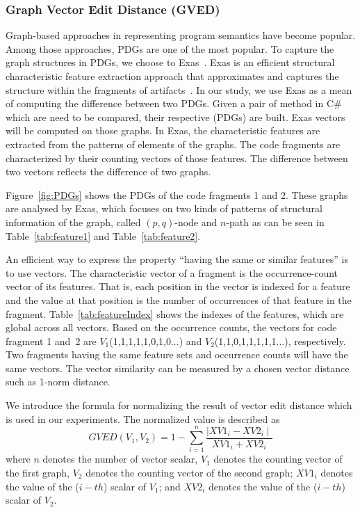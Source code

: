 \subsubsection{\textbf{Graph Vector Edit Distance (GVED)}}

Graph-based approaches in representing program semantics have become
popular. Among those approaches, PDGs are one of the most popular.  To
capture the graph structures in PDGs, we choose to Exas~\cite{fase09}.
Exas is an efficient structural characteristic feature extraction
approach that approximates and captures the structure within the
fragments of artifacts~\cite{fase09}.  In our study, we use Exas as a
mean of computing the difference between two PDGs. Given a pair of
method in C\# which are need to be compared, their respective
(PDGs) are built.
Exas vectors will be computed on those graphs. In Exas, the
characteristic features are extracted from the patterns of elements of
the graphs. The code fragments are characterized by their counting
vectors of those features. The difference between two vectors reflects
the difference of two graphs.


Figure~\ref{fig:PDGs} shows the PDGs of the code fragments 1 and
2. These graphs are analysed by Exas, which focuses on two kinds of
patterns of structural information of the graph, called $\left(p,q\right)$-node
and $n$-path as can be seen in Table~\ref{tab:feature1} and
Table~\ref{tab:feature2}.

An efficient way to express the property ``having the same or similar
features'' is to use vectors. The characteristic vector of a fragment
is the occurrence-count vector of its features. That is, each position
in the vector is indexed for a feature and the value at that position
is the number of occurrences of that feature in the
fragment. Table~\ref{tab:featureIndex} shows the indexes of the
features, which are global across all vectors. Based on the occurrence
counts, the vectors for code fragment 1 and~2 are
$V_1$(1,1,1,1,1,0,1,0...) and $V_2$(1,1,0,1,1,1,1,1...),
respectively. Two fragments having the same feature sets and
occurrence counts will have the same vectors. The
vector similarity can be measured by a chosen vector distance such as
1-norm distance.

We introduce the formula for normalizing the result of vector edit
distance which is used in our experiments. The normalized
value is described as
\[GVED \left( V_1, V_2 \right) = 1 - \sum_{i=1}^{n} \frac{ \mid XV1_i - XV2_i \mid}{XV1_i + XV2_i}\]
where $n$ denotes the number of vector scalar, $V_1$ denotes the
counting vector of the first graph, $V_2$ denotes the counting vector
of the second graph; $XV1_i$ denotes the value of the ($i-th$) scalar
of $V_1$; and $XV2_i$ denotes the value of the ($i-th$) scalar of
$V_2$.

